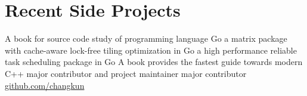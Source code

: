 \section{\textbf{Recent Side Projects}}
  \resumeSubHeadingListStart
      {A book for source code study of programming language Go}
      {a matrix package with cache-aware lock-free tiling optimization in Go}
      {a high performance reliable task scheduling package in Go}
      {A book provides the fastest guide towards modern C++}
      {major contributor and project maintainer}
      {major contributor}
      {\href{https://github.com/changkun/}{github.com/changkun}}
  \resumeSubHeadingListEnd